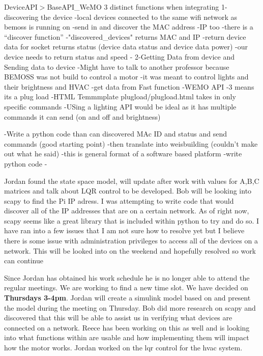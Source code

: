 \documentclass[fontsize=11pt, %
                             paper=letter, %
                             twoside, %
                             captions=tableheading,
                             index=totoc,
                             hyperref]{labbook}
\begin{document}
DeviceAPI$>$BaseAPI\_WeMO
3 distinct functions when integrating
1-discovering the device
    -local devices connected to the same wifi network as bemoss is running on
    -send in and discover the MAC address
    -IP too
    -there is a ``discover function''
    -"discovered\_devices" returns MAC and IP
    -return device data for socket returns status (device data status and device data power) 
    -our device needs to return status and speed 
    -
2-Getting Data from device and Sending data to device 
    -Might have to talk to another professor because BEMOSS was not build to control a motor
        -it was meant to control lights and their brightness and HVAC 
        -get data from Fast function 
        -WEMO API
        -3 means its a plug load
        -HTML Temmmplate plugload/plugload.html takes in only specific commands 
        -USing a lighting API would be ideal as it has multiple commands it can send (on and off and brightness) 
        
-Write a python code than can discovered MAc ID and status and send commands (good starting point) 
-then translate into weisbuilding (couldn't make out what he said) 
-this is general format of a software based platform 
-write python code 
-

Jordan found the state space model, will update after work with values for A,B,C matrices and talk about LQR control to be developed.
Bob will be looking into scapy to find the Pi IP adress.
I was attempting to write code that would discover all of the IP addresses that are on a certain network. As of right now, scapy seems like a great library that is included within python to try and do so. I have ran into a few issues that I am not sure how to resolve yet but I believe there is some issue with administration privileges to access all of the devices on a network. This will be looked into on the weekend and hopefully resolved so work can continue

Since Jordan has obtained his work schedule he is no longer able to attend the regular meetings. We are working to find a new time slot. We have decided on \textbf{Thursdays 3-4pm}. 
\newline
Jordan will create a simulink model based on \cite{Serrano1999} and present the model during the meeting on Thursday.
Bob did more research on scapy and discovered that this will be able to assist us in verifying what devices are connected on a network. Reece has been working on this as well and is looking into what functions within are usable and how implementing them will impact how the motor works. Jordan worked on the lqr control for the hvac system.
\end{document}
